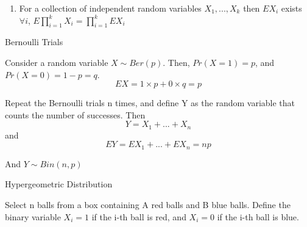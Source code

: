 \documentclass{report}
\begin{document}
\begin{description}
\begin{mdframed}
\begin{enumerate}
               \item For a collection of independent random variables
                   $X_1, ... , X_k$ then  
                   $EX_i$ exists $\forall i$,
                   $E \prod_{i=1}^k X_i = \prod_{i=1}^k EX_i$
           \end{enumerate}
       \end{mdframed} 
       \pagebreak
    \item {\large Bernoulli Trials}
        \begin{mdframed}
            Consider a random variable $X \sim Ber(p)$. Then,
            $Pr(X = 1) = p$, and  $Pr(X = 0) = 1 - p = q$.
            \begin{displaymath}
                EX = 1 \times p + 0 \times q = p
            \end{displaymath}
             
            Repeat the Bernoulli trials n times, and define
            Y as the random variable that counts the number of
            successes. Then
            \begin{displaymath}
                Y = X_1 + ... + X_n
            \end{displaymath}
            and
            \begin{displaymath}
                EY = EX_1 + ... + EX_n = np
            \end{displaymath}

            And $Y \sim Bin(n,p)$
        \end{mdframed}
    \item {\large Hypergeometric Distribution}
        \begin{mdframed}
            Select n balls from a box containing A red balls
            and B blue balls. Define the binary variable
            $X_i = 1$ if the i-th ball is red, and $X_i = 0$ 
            if the i-th ball is blue.


\end{mdframed}
\end{description}
\end{document}
